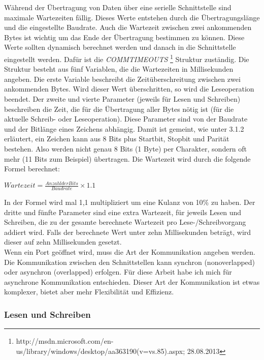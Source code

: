 Während der Übertragung von Daten über eine serielle Schnittstelle sind maximale Wartezeiten fällig. Dieses Werte entstehen durch die Übertragungslänge und die eingestellte Baudrate. Auch die Wartezeit zwischen zwei ankommenden Bytes ist wichtig um das Ende der Übertragung bestimmen zu können. Diese Werte sollten dynamisch berechnet werden und danach in die Schnittstelle eingestellt werden. Dafür ist die \textit{COMMTIMEOUTS} \footnote{http://msdn.microsoft.com/en-us/library/windows/desktop/aa363190(v=vs.85).aspx; 28.08.2013} Struktur zuständig. Die Struktur besteht aus fünf Variablen, die die Wartezeiten in Millisekunden angeben. Die erste Variable beschreibt die Zeitüberschreitung zwischen zwei ankommenden Bytes. Wird dieser Wert überschritten, so wird die Leseoperation beendet. Der zweite und vierte Parameter (jeweils für Lesen und Schreiben) beschreiben die Zeit, die für die Übertragung aller Bytes nötig ist (für die aktuelle Schreib- oder Leseoperation). Diese Parameter sind von der Baudrate und der Bitlänge eines Zeichens abhängig. Damit ist gemeint, wie unter 3.1.2 erläutert, ein Zeichen kann aus 8 Bits plus Startbit, Stopbit und Parität bestehen. Also werden nicht genau 8 Bits (1 Byte) per Charakter, sondern oft mehr (11 Bits zum Beispiel) übertragen. Die Wartezeit wird durch die folgende Formel berechnet:

\begin{center}
$ Wartezeit = \frac{Anzahl der Bits}{Baudrate} \times 1.1$
\end{center}

In der Formel wird mal 1,1 multipliziert um eine Kulanz von 10\% zu haben. Der dritte und fünfte Parameter sind eine extra Wartezeit, für jeweils Lesen und Schreiben, die zu der gesamte berechnete Wartezeit pro Lese-/Schreibvorgang addiert wird. Falls der berechnete Wert unter zehn Millisekunden beträgt, wird dieser auf zehn Millisekunden gesetzt.
\\

Wenn ein Port geöffnet wird, muss die Art der Kommunikation angeben werden. Die Kommunikation zwischen den Schnittstellen kann synchron (nonoverlapped) oder asynchron (overlapped) erfolgen. Für diese Arbeit habe ich mich für asynchrone Kommunikation entschieden. Dieser Art der Kommunikation ist etwas komplexer, bietet aber mehr Flexibilität und Effizienz.



\subsubsection{Lesen und Schreiben}
